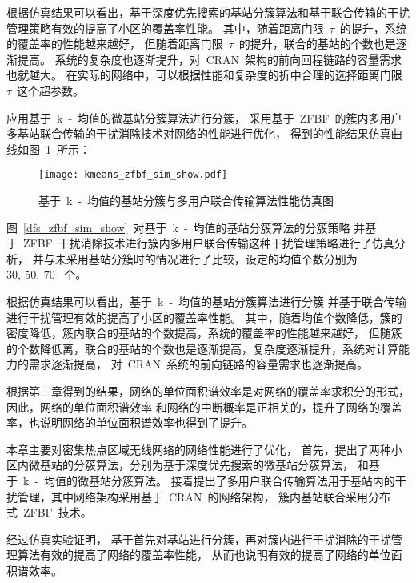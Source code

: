 根据仿真结果可以看出，基于深度优先搜索的基站分簇算法和基于联合传输的干扰管理策略有效的提高了小区的覆盖率性能。
其中，随着距离门限~$\tau$~的提升，系统的覆盖率的性能越来越好，
但随着距离门限~$\tau$~的提升，联合的基站的个数也是逐渐提高。
系统的复杂度也逐渐提升，对~CRAN~架构的前向回程链路的容量需求也就越大。
在实际的网络中，可以根据性能和复杂度的折中合理的选择距离门限~$\tau$~这个超参数。

应用基于~k~-~均值的微基站分簇算法进行分簇，
采用基于~ZFBF~的簇内多用户多基站联合传输的干扰消除技术对网络的性能进行优化，
得到的性能结果仿真曲线如图~\ref{kmeans_zfbf_sim_show}~所示：
\begin{figure}[htbp]
\centering
\texttt{[image: kmeans\_zfbf\_sim\_show.pdf]}
\caption{基于~k~-~均值的基站分簇与多用户联合传输算法性能仿真图}\vspace{-0.5em}
\label{kmeans_zfbf_sim_show}
\end{figure}

图~\ref{dfs_zfbf_sim_show}~对基于~k~-~均值的基站分簇算法的分簇策略
并基于~ZFBF~干扰消除技术进行簇内多用户联合传输这种干扰管理策略进行了仿真分析，
并与未采用基站分簇时的情况进行了比较，设定的均值个数分别为~$30,~50,~70$~ 个。

根据仿真结果可以看出，基于~k~-~均值的基站分簇算法进行分簇
并基于联合传输进行干扰管理有效的提高了小区的覆盖率性能。
其中，随着均值个数降低，簇的密度降低，簇内联合的基站的个数提高，系统的覆盖率的性能越来越好，
但随簇的个数降低离，联合的基站的个数也是逐渐提高，复杂度逐渐提升，系统对计算能力的需求逐渐提高，
对~CRAN~系统的前向链路的容量需求也逐渐提高。

根据第三章得到的结果，网络的单位面积谱效率是对网络的覆盖率求积分的形式，因此，网络的单位面积谱效率
和网络的中断概率是正相关的，提升了网络的覆盖率，也说明网络的单位面积谱效率也得到了提升。


本章主要对密集热点区域无线网络的网络性能进行了优化，
首先，提出了两种小区内微基站的分簇算法，分别为基于深度优先搜索的微基站分簇算法，
和基于~k~-~均值的微基站分簇算法。
接着提出了多用户联合传输算法用于基站内的干扰管理，其中网络架构采用基于~CRAN~的网络架构，
簇内基站联合采用分布式~ZFBF~技术。

经过仿真实验证明，
基于首先对基站进行分簇，再对簇内进行干扰消除的干扰管理算法有效的提高了网络的覆盖率性能，
从而也说明有效的提高了网络的单位面积谱效率。
